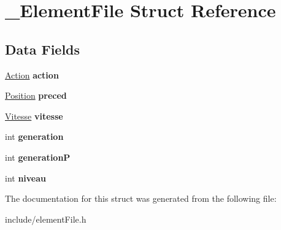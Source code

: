 \hypertarget{struct___element_file}{\section{\-\_\-\-Element\-File Struct Reference}
\label{struct___element_file}
}
\subsection*{Data Fields}
\begin{DoxyCompactItemize}
\item 
\hypertarget{struct___element_file_aa9cf7d0afedceb0d21dd5f412fe08c18}{\hyperlink{struct___action}{Action} {\bfseries action}}\label{struct___element_file_aa9cf7d0afedceb0d21dd5f412fe08c18}

\item 
\hypertarget{struct___element_file_a817ebe9ca292a4b41fb9321a5d8b47d3}{\hyperlink{struct___position}{Position} {\bfseries preced}}\label{struct___element_file_a817ebe9ca292a4b41fb9321a5d8b47d3}

\item 
\hypertarget{struct___element_file_a1cf73bdb87ff4199bc5d1d0c990a99b5}{\hyperlink{struct___action}{Vitesse} {\bfseries vitesse}}\label{struct___element_file_a1cf73bdb87ff4199bc5d1d0c990a99b5}

\item 
\hypertarget{struct___element_file_aad8eab95bc6ae0373f10cb2a0bdeb88c}{int {\bfseries generation}}\label{struct___element_file_aad8eab95bc6ae0373f10cb2a0bdeb88c}

\item 
\hypertarget{struct___element_file_a23d80f462341a17497259ce5be72f10f}{int {\bfseries generation\-P}}\label{struct___element_file_a23d80f462341a17497259ce5be72f10f}

\item 
\hypertarget{struct___element_file_a01662fc98c8f04492826890e0b34bd72}{int {\bfseries niveau}}\label{struct___element_file_a01662fc98c8f04492826890e0b34bd72}

\end{DoxyCompactItemize}


The documentation for this struct was generated from the following file\-:\begin{DoxyCompactItemize}
\item 
include/element\-File.\-h\end{DoxyCompactItemize}
